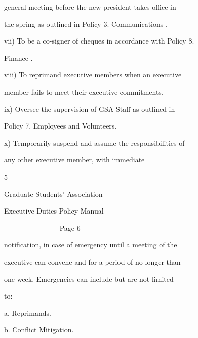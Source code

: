                   general meeting before the new president takes office in  

                  the spring as outlined in Policy 3. Communications .   

  

         vii)     To be a co-signer of cheques in accordance with Policy 8.  

                  Finance .   

  

         viii)    To  reprimand  executive  members  when  an  executive  

                  member fails to meet their executive commitments.   

  

         ix)      Oversee  the  supervision  of  GSA  Staff  as  outlined  in  



                  Policy 7. Employees and Volunteers.   

  

         x)       Temporarily  suspend  and  assume  the  responsibilities  of  

                  any       other       executive         member,          with       immediate  



                                                  5  

                                      

                                    Graduate Students’ Association  

                                   Executive Duties Policy Manual  

  


----------------------- Page 6-----------------------

                   notification, in case of emergency until a meeting of the  

                   executive can convene and for a period of no longer than  

                   one  week.  Emergencies  can  include  but  are  not  limited  

                   to:   

  

                            a. Reprimands.   

  

                            b. Conflict Mitigation.   

